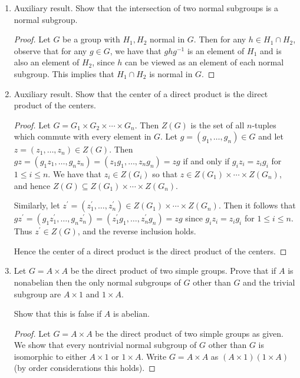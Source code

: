 \documentclass[11pt]{article}
\DeclareMathOperator{\lcm}{lcm}
\begin{document}
\begin{enumerate}
\begin{proof}
      Then $H$ (with order $p^n$ for some $n$) must take on the form $Z_p \times \cdots \times Z_p \cong \mathbb{F}_p^n$ (the order of elements in this group is at most $\lcm(p,\dots,p) = p$). Hence $H$ is an elementary abelian $p$-group for some prime $p$.
    \end{proof}
    \item Auxiliary result. Show that the intersection of two normal subgroups is a normal subgroup.
    \begin{proof}
      Let $G$ be a group with $H_1,H_2$ normal in $G$. Then for any $h\in H_1\cap H_2$, observe that for any $g\in G$, we have that $ghg^{-1}$ is an element of $H_1$ and is also an element of $H_2$, since $h$ can be viewed as an element of each normal subgroup. This implies that $H_1\cap H_2$ is normal in $G$.
    \end{proof}
    \item Auxiliary result. Show that the center of a direct product is the direct product of the centers.
    \begin{proof}
      Let $G = G_1\times G_2 \times \cdots \times G_n$. Then $Z(G)$ is the set of all $n$-tuples which commute with every element in $G$. Let $g = (g_1, \dots, g_n)\in G$ and let $z = (z_1, \dots, z_n)\in Z(G)$. Then $gz = (g_1z_1, \dots, g_nz_n) = (z_1g_1, \dots, z_ng_n) = zg$ if and only if $g_iz_i = z_ig_i$ for $1\leq i \leq n$. We have that $z_i\in Z(G_i)$ so that $z\in Z(G_1)\times \cdots \times Z(G_n)$, and hence $Z(G) \subseteq Z(G_1)\times \cdots \times Z(G_n)$.

      Similarly, let $z^{\prime} = (z^{\prime}_1, \dots, z^{\prime}_n)\in Z(G_1)\times \cdots \times Z(G_n)$. Then it follows that $gz^{\prime} = (g_1z^{\prime}_1, \dots, g_nz^{\prime}_n) = (z^{\prime}_1g_1, \dots, z^{\prime}_ng_n) = zg$ since $g_iz_i = z_ig_i$ for $1\leq i \leq n$. Thus $z^{\prime}\in Z(G)$, and the reverse inclusion holds.

      Hence the center of a direct product is the direct product of the centers.
    \end{proof}
    \item Let $G=A \times A$ be the direct product of two simple groups. Prove that if $A$ is nonabelian then the only normal subgroups of $G$ other than $G$ and the trivial subgroup are $A\times 1$ and $1\times A$.
    
    Show that this is false if $A$ is abelian.
    \begin{proof}
      Let $G = A\times A$ be the direct product of two simple groups as given. We show that every nontrivial normal subgroup of $G$ other than $G$ is isomorphic to either $A\times 1$ or $1\times A$. Write $G = A\times A$ as $(A\times 1)(1\times A)$ (by order considerations this holds). 


\end{proof}
\end{enumerate}
\end{document}
